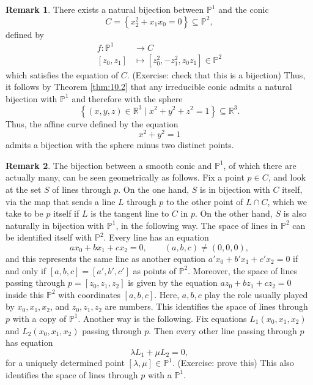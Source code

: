 \documentclass{article}
\newcommand{\R}{\mathbb{R}}
\renewcommand{\P}{\mathbb{P}}
\newcommand{\rb}[1]{\left( #1 \right)}
\renewcommand{\sb}[1]{\left[ #1 \right]}
\newcommand{\cb}[1]{\left\{ #1 \right\}}
\theoremstyle{definition}\newtheorem{definition}{Definition}[section]
\theoremstyle{definition}\newtheorem{notation}[definition]{Notation}
\theoremstyle{definition}\newtheorem{remark}[definition]{Remark}
\theoremstyle{definition}\newtheorem{example1}[definition]{Example}
\theoremstyle{definition}\newtheorem{fact}{Fact}
\theoremstyle{definition}\newtheorem{exercise}{Exercise}
\theoremstyle{definition}\newtheorem*{example2}{Example}
\begin{document}
\begin{remark}
There exists a natural bijection between $ \P^1 $ and the conic
$$ C = \cb{x_2^2 + x_1x_0 = 0} \subseteq \P^2, $$
defined by
\begin{align*}
f : \P^1 & \to C \\
\sb{z_0, z_1} & \mapsto \sb{z_0^2, -z_1^2, z_0z_1} \in \P^2
\end{align*}
which satisfies the equation of $ C $. (Exercise: check that this is a bijection) Thus, it follows by Theorem \ref{thm:10.2} that any irreducible conic admits a natural bijection with $ \P^1 $ and therefore with the sphere
$$ \cb{\rb{x, y, z} \in \R^3 \mid x^2 + y^2 + z^2 = 1} \subseteq \R^3. $$
Thus, the affine curve defined by the equation
$$ x^2 + y^2 = 1 $$
admits a bijection with the sphere minus two distinct points.
\end{remark}

\begin{remark}
The bijection between a smooth conic and $ \P^1 $, of which there are actually many, can be seen geometrically as follows. Fix a point $ p \in C $, and look at the set $ S $ of lines through $ p $. On the one hand, $ S $ is in bijection with $ C $ itself, via the map that sends a line $ L $ through $ p $ to the other point of $ L \cap C $, which we take to be $ p $ itself if $ L $ is the tangent line to $ C $ in $ p $. On the other hand, $ S $ is also naturally in bijection with $ \P^1 $, in the following way. The space of lines in $ \P^2 $ can be identified itself with $ \P^2 $. Every line has an equation
$$ ax_0 + bx_1 + cx_2 = 0, \qquad \rb{a, b, c} \ne \rb{0, 0, 0}, $$
and this represents the same line as another equation $ a'x_0 + b'x_1 + c'x_2 = 0 $ if and only if $ \sb{a, b, c} = \sb{a', b', c'} $ as points of $ \P^2 $. Moreover, the space of lines passing through $ p = \sb{z_0, z_1, z_2} $ is given by the equation $ az_0 + bz_1 + cz_2 = 0 $ inside this $ \P^2 $ with coordinates $ \sb{a, b, c} $. Here, $ a, b, c $ play the role usually played by $ x_0, x_1, x_2 $, and $ z_0, z_1, z_2 $ are numbers. This identifies the space of lines through $ p $ with a copy of $ \P^1 $. Another way is the following. Fix equations $ L_1\rb{x_0, x_1, x_2} $ and $ L_2\rb{x_0, x_1, x_2} $ passing through $ p $. Then every other line passing through $ p $ has equation
$$ \lambda L_1 + \mu L_2 = 0, $$
for a uniquely determined point $ \sb{\lambda, \mu} \in \P^1 $. (Exercise: prove this) This also identifies the space of lines through $ p $ with a $ \P^1 $.
\end{remark}
\end{document}
